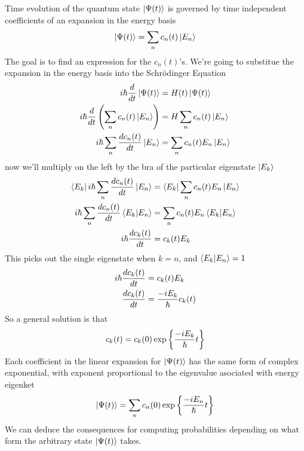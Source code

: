 \documentclass[english, 11pt]{article}
\begin{document}
    Time evolution of the quantum state $\left|\Psi(t)\right\rangle$ is governed by time independent coefficients of an expansion in the energy basis
    \[ \left|\Psi(t)\right\rangle = \sum_n c_n(t)\left|E_n\right\rangle \]
    The goal is to find an expression for the $c_n(t)$'s. We're going to substitue the expansion in the energy basis into the Schrödinger Equation
    \begin{align*}
      i\hbar\frac{d}{dt} \left|\Psi(t)\right\rangle & = H(t)\left|\Psi(t)\right\rangle \\
      i\hbar\frac{d}{dt} \left( \sum_n c_n(t) \left|E_n\right\rangle \right) & = H\sum_n c_n(t)\left|E_n\right\rangle \\
      i\hbar \sum_n \frac{dc_n(t)}{dt} \left|E_n\right\rangle & = \sum_n c_n(t) E_n \left|E_n\right\rangle \\
    \end{align*}
    now we'll multiply on the left by the bra of the particular eigenstate $\left|E_k\right\rangle$
    \begin{align*}
      \bra{E_k} i\hbar \sum_n \f{dc_n(t)}{dt} \ket{E_n} & = \bra{E_k} \sum_n c_n(t) E_n \ket{E_n} \\
      i\hbar \sum_n \f{dc_n(t)}{dt}\braket{E_k}{E_n} & = \sum_n c_n(t)E_n\braket{E_k}{E_n} \\
      i\hbar \f{dc_k(t)}{dt} & = c_k(t)E_k
    \end{align*}
    This picks out the single eigenstate when $k=n$, and $\braket{E_k}{E_n} =1$
    \begin{align*}
      i\hbar \frac{dc_k(t)}{dt} & = c_k(t)E_k \\
      \frac{dc_k(t)}{dt} & = \frac{-iE_k}{\hbar} c_k(t)
    \end{align*}
    So a general solution is that
    \[ c_k(t) = c_k(0) \exp \left\{ \frac{-iE_k}{\hbar} t \right\} \]
    Each coefficient in the linear expansion for $\left|\Psi(t)\right\rangle$ has the same form of complex exponential, with exponent proportional to the eigenvalue asociated with energy eigenket
    \[ \left|\Psi(t)\right\rangle = \sum_n c_n(0)\exp\left\{\frac{-iE_n}{\hbar} t\right\} \]
    We can deduce the consequences for computing probabilities depending on what form the arbitrary state $\left|\Psi(t)\right\rangle$ takes.
\end{document}
